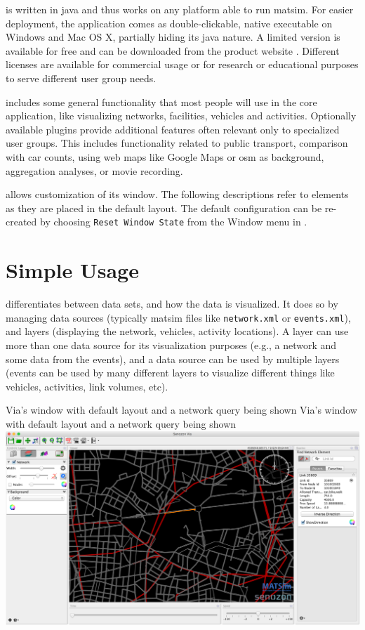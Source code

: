 \Via{} is written in \gls{java} and thus works on any platform able to run
\gls{matsim}. For easier deployment, the application comes as double-clickable, native
executable on Windows and Mac OS X, partially hiding its \gls{java} nature. A
limited version is available for free and can be downloaded from the product
website \citep[][]{senozonVIA_Webpage_2015}. 
Different licenses are available for commercial usage or for research or educational purposes
 to serve  different user group needs.

\Via{} includes some general functionality that most people will use in the core
application, like visualizing networks, facilities, vehicles and activities.
Optionally available plugins provide additional features 
often relevant only to specialized user groups. This includes functionality related
to public transport, comparison with car counts, using web maps like Google Maps
or \gls{osm} as background, aggregation analyses, or movie recording.

\Via{} allows customization of its window. The following descriptions refer to
elements as they are placed in the default layout. The default configuration can
be re-created by choosing \lstinline|Reset Window State| from the Window menu in \Via{}.

\section{Simple Usage}
\Via{} differentiates between data sets, and how the data is visualized. It
does so by managing data sources (typically \gls{matsim} files like \lstinline|network.xml|
or \lstinline|events.xml|), and layers (\eg displaying the network, vehicles,
activity locations). A layer can use more than one data source for its
visualization purposes (e.g., a network and some data from the events), and a
data source can be used by multiple layers (\eg events can be used by many
different layers to visualize different things like vehicles, activities, link
volumes, etc).

\createfigure%
{Via's window with default layout and a network query being shown}%
{Via's window with default layout and a network query being shown}%
{\label{fig:via:window}}%
{\includegraphics[width=1.\textwidth,angle=0]{./extending/figures/via/window.png}}%
{}

